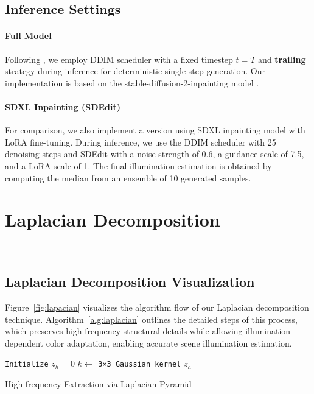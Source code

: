 \subsection{Inference Settings}
\paragraph{Full Model} Following \citeauthor{garcia2024fine} \cite{garcia2024fine}, we employ DDIM scheduler with a fixed timestep $t=T$ and \textbf{trailing} strategy during inference for deterministic single-step generation. Our implementation is based on the stable-diffusion-2-inpainting model \cite{rombach2021highresolution}.
\paragraph{SDXL Inpainting (SDEdit)} 
For comparison, we also implement a version using SDXL inpainting model \cite{rombach2021highresolution} with LoRA \cite{hu2021lora} fine-tuning. During inference, we use the DDIM scheduler with 25 denoising steps and SDEdit with a noise strength of 0.6, a guidance scale of 7.5, and a LoRA scale of 1. The final illumination estimation is obtained by computing the median from an ensemble of 10 generated samples.
\section{Laplacian Decomposition}~\label{sec:Laplacian}



\subsection{Laplacian Decomposition Visualization}
Figure~\ref{fig:lapacian} visualizes the algorithm flow of our Laplacian decomposition technique. Algorithm~\ref{alg:laplacian} outlines the detailed steps of this process, which preserves high-frequency structural details while allowing illumination-dependent color adaptation, enabling accurate scene illumination estimation.

\begin{algorithm}[h!]
\footnotesize
\SetAlgoLined
\DontPrintSemicolon
{}
\texttt{Initialize} $z_h = 0$\;
$k \leftarrow$ \texttt{3×3 Gaussian kernel}\;
\Return $z_h$
\caption{High-frequency Extraction via Laplacian Pyramid}
\label{alg:laplacian}
\end{algorithm}



